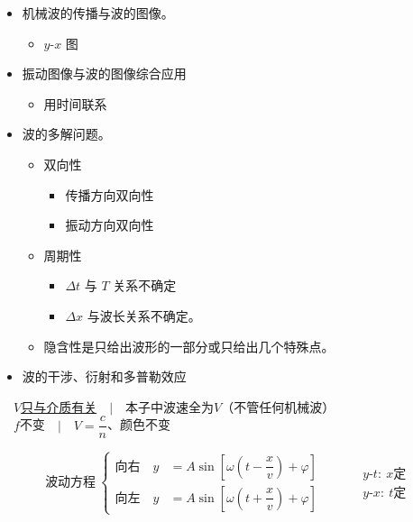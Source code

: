 \begin{itemize}
\item 机械波的传播与波的图像。
  \begin{itemize}
  \item $y$-$x$ 图
  \end{itemize}
\item 振动图像与波的图像综合应用
  \begin{itemize}
  \item 用时间联系
  \end{itemize}
\item 波的多解问题。
  \begin{itemize}
  \item 双向性
    \begin{itemize}
    \item 传播方向双向性
    \item 振动方向双向性
    \end{itemize}
  \item 周期性
    \begin{itemize}
    \item $\Delta t$ 与 $T$ 关系不确定
    \item $\Delta x$ 与波长关系不确定。
    \end{itemize}
  \item 隐含性\quad 是只给出波形的一部分或只给出几个特殊点。
  \end{itemize}
\item 波的干涉、衍射和多普勒效应
\end{itemize}

　\underline{$V$只与介质有关}　$\big|$　本子中波速全为$V$（不管任何机械波）\\[1ex]
　$f$不变　$\big|$　$V=\dfrac{c}{n}$、颜色不变

\[
\text{波动方程}\ \left\{\begin{aligned}
\text{向右}\quad y&=A\sin\left[\omega\left(t-\dfrac{x}{v}\right)+\varphi\right]\\
\text{向左}\quad y&=A\sin\left[\omega\left(t+\dfrac{x}{v}\right)+\varphi\right]
\end{aligned}\right.
\qquad
\begin{aligned}
&y\text{-}t:\ x\text{定}\\
&y\text{-}x:\ t\text{定}
\end{aligned}
\]


